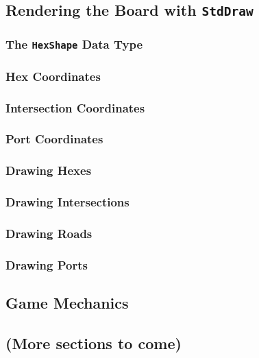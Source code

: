 \documentclass[pageno]{jpaper}
\begin{document}
\begin{doublespacing}
\subsection{Rendering the Board with \lstinline$StdDraw$}

\subsubsection{The \lstinline$HexShape$ Data Type}

\subsubsection{Hex Coordinates}

\subsubsection{Intersection Coordinates}

\subsubsection{Port Coordinates}

\subsubsection{Drawing Hexes}

\subsubsection{Drawing Intersections}

\subsubsection{Drawing Roads}

\subsubsection{Drawing Ports}

\subsection{Game Mechanics}

\subsection{(More sections to come)}


\end{doublespacing}
\end{document}
